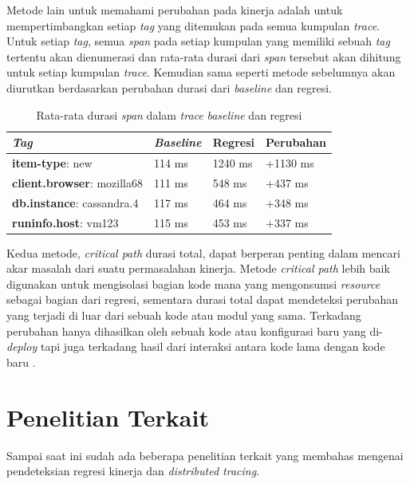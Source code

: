 Metode lain untuk memahami perubahan pada kinerja adalah untuk mempertimbangkan setiap \textit{tag} yang ditemukan pada semua kumpulan \textit{trace}. Untuk setiap \textit{tag}, semua \textit{span} pada setiap kumpulan yang memiliki sebuah \textit{tag} tertentu akan dienumerasi dan rata-rata durasi dari \textit{span} tersebut akan dihitung untuk setiap kumpulan \textit{trace}. Kemudian sama seperti metode sebelumnya akan diurutkan berdasarkan perubahan durasi dari \textit{baseline} dan regresi.
\begin{small}
	\begin{longtable}{ | p{5cm} | p{2cm} | p{2cm} | p{2cm} | }
		\caption{Rata-rata durasi \textit{span} dalam \textit{trace} \textit{baseline} dan regresi}
		\label{corr-tab-3}                                                           
		\\ \hline
		\centering\bfseries{\textit{Tag}} & \centering\bfseries{\textit{Baseline}} & \centering\bfseries{Regresi} & \centering\bfseries{Perubahan} \tabularnewline \hline
		\endfirsthead
		\textbf{item-type}: new & 114 ms & 1240 ms & +1130 ms \\ \hline
		\textbf{client.browser}: mozilla68 & 111 ms & 548 ms & +437 ms \\ \hline
		\textbf{db.instance}: cassandra.4 & 117 ms & 464 ms & +348 ms \\ \hline
		\textbf{runinfo.host}: vm123 & 115 ms & 453 ms & +337 ms \\ \hline
	\end{longtable}
\end{small}

Kedua metode, \textit{critical path} durasi total, dapat berperan penting dalam mencari akar masalah dari suatu permasalahan kinerja. Metode \textit{critical path} lebih baik digunakan untuk mengisolasi bagian kode mana yang mengonsumsi \textit{resource} sebagai bagian dari regresi, sementara durasi total dapat mendeteksi perubahan yang terjadi di luar dari sebuah kode atau modul yang sama. Terkadang perubahan hanya dihasilkan oleh sebuah kode atau konfigurasi baru yang di-\textit{deploy} tapi juga terkadang hasil dari interaksi antara kode lama dengan kode baru \citep{parker2020distributed}. 

\section{Penelitian Terkait}
\label{terkait}
Sampai saat ini sudah ada beberapa penelitian terkait yang membahas mengenai pendeteksian regresi kinerja dan \textit{distributed tracing}.

